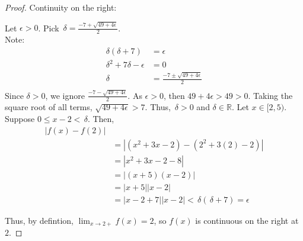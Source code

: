 \documentclass{article}
\begin{document}
  \begin{proof}
    Continuity on the right:
    
    Let $\epsilon > 0$. Pick $\,\delta = \frac{-7 + \sqrt{49 +4\epsilon}}{2}$. \\
    Note:
    \begin{align*}
      \delta(\delta + 7) &= \epsilon \\
      \delta^2 + 7\delta - \epsilon &= 0\\
      \delta &= \frac{-7 \pm \sqrt{49 +4\epsilon}}{2} \\ 
    \end{align*}
    Since $\delta > 0$, we ignore $\frac{-7 - \sqrt{49 +4\epsilon}}{2}$. As $\epsilon > 0$, then
    $49 +4\epsilon > 49 > 0$. Taking the square root of all terms, $\sqrt{49 +4\epsilon} > 7$.
    Thus, $\,\delta > 0$ and $\delta \in \mathbb{R}$. Let $x \in [2,5)$. Suppose
    $0 \leq x-2 < \,\delta$. Then,
    \begin{align*}
      |f(x) - f(2)| &\\
                    &=|(x^2 +3x - 2) - (2^2 + 3(2) - 2)|\\
                    &=|x^2 + 3x - 2 -8|\\
                    &=|(x+5)(x-2)| \\
                    &=|x+5||x-2| \\
                    &=|x-2 + 7||x-2| <\,\delta(\,\delta + 7) = \epsilon
    \end{align*}

    Thus, by defintion, $\lim_{x \rightarrow 2+}f(x) = 2$, so $f(x)$ is continuous on the right at $2$.
  \end{proof}
\end{document}
